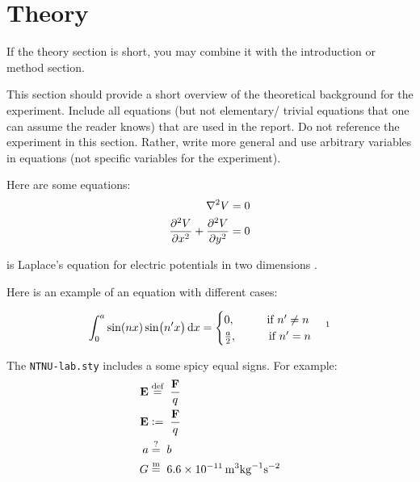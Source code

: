 \section{Theory}

If the theory section is short, you may combine it with the introduction or method section. \par

This section should provide a short overview of the theoretical background for the experiment. Include all equations (but not elementary/ trivial equations that one can assume the reader knows) that are used in the report. Do not reference the experiment in this section. Rather, write more general and use arbitrary variables in equations (not specific variables for the experiment). \par

Here are some equations:
\begin{align} %
    \laplacian{V} &=0 \nonumber \\
    \frac{\partial^2 V}{\partial x^2}+\dpd[2]{V}{y} &=0 \label{eq:Laplace} %
\end{align}

is Laplace's equation for electric potentials in two dimensions \parencite[131,136]{Griffiths}. \par
Here is an example of an equation with different cases:

\begin{align*} %
    \int_{0}^{a}\sin(nx)\sin(n'x) \dd x = 
    \begin{cases} 
        0, \hspace{1cm} \text{if } n'\neq n \\ 
        \frac{a}{2}, \hspace{1cm} \text{if } n'= n
    \end{cases}
    \footnotemark{}
\end{align*}

The \verb+NTNU-lab.sty+ includes a some spicy equal signs. For example: 
\begin{align}
    \vb{E} & \defeq \frac{\vb{F}}{q} \label{eq:def} \\
    \vb{E} &\coleq\frac{\vb{F}}{q} \label{eq:col} \\
    a      &\qmeq b                 \label{eq:qm}  \\
    G      &\meq \SI{6.6e-11}{m^3 kg^{-1} s^{-2}}  \label{eq:m} 
\end{align}

